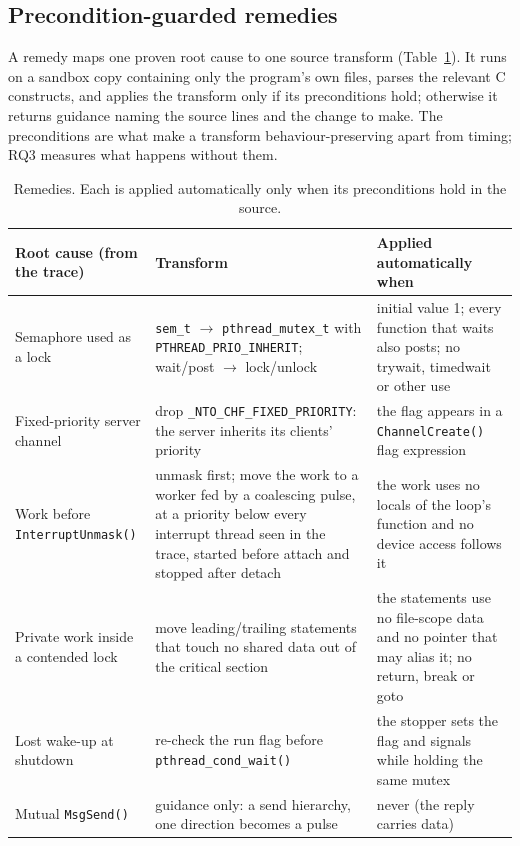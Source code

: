 \documentclass[sigconf,review]{acmart}
\newcommand{\qnx}[1]{\texttt{#1}}
\begin{document}
\subsection{Precondition-guarded remedies}

A remedy maps one proven root cause to one source transform (Table~\ref{tab:remedies}). It runs on a sandbox copy containing
only the program's own files, parses the relevant C constructs, and applies the transform only if its preconditions hold;
otherwise it returns guidance naming the source lines and the change to make. The preconditions are what make a transform
behaviour-preserving apart from timing; RQ3 measures what happens without them.

\begin{table}[t]
\caption{Remedies. Each is applied automatically only when its preconditions hold in the source.}
\label{tab:remedies}
\small
\begin{tabular}{@{}p{}p{}p{}@{}}
\toprule
Root cause (from the trace) & Transform & Applied automatically when \\
\midrule
Semaphore used as a lock & \qnx{sem\_t} $\to$ \qnx{pthread\_mutex\_t} with \qnx{PTHREAD\_PRIO\_INHERIT}; wait/post $\to$ lock/unlock &
  initial value 1; every function that waits also posts; no trywait, timedwait or other use \\
Fixed-priority server channel & drop \qnx{\_NTO\_CHF\_FIXED\_PRIORITY}: the server inherits its clients' priority &
  the flag appears in a \qnx{ChannelCreate()} flag expression \\
Work before \qnx{InterruptUnmask()} & unmask first; move the work to a worker fed by a coalescing pulse, at a priority below every
  interrupt thread seen in the trace, started before attach and stopped after detach &
  the work uses no locals of the loop's function and no device access follows it \\
Private work inside a contended lock & move leading/trailing statements that touch no shared data out of the critical section &
  the statements use no file-scope data and no pointer that may alias it; no return, break or goto \\
Lost wake-up at shutdown & re-check the run flag before \qnx{pthread\_cond\_wait()} & the stopper sets the flag and signals
  while holding the same mutex \\
Mutual \qnx{MsgSend()} & guidance only: a send hierarchy, one direction becomes a pulse & never (the reply carries data) \\
\bottomrule
\end{tabular}
\end{table}
\end{document}
